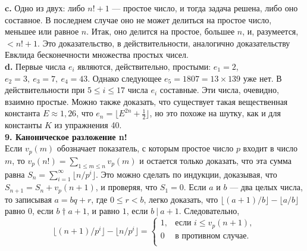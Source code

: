 \noindent\hspace*{15pt}\textbf{c.} Одно из двух: либо $n!+1$ — простое число, и тогда задача реше­на,\linebreak
либо оно составное. В последнем случае оно не может делиться на\linebreak
простое число, меньшее или равное $n$. Итак, оно делится на простое, большее $n$, и, разумеется, $<n!+1$. Это доказательство, в действитель­ности, аналогично доказательству Евклида бесконечности множества простых чисел.\newline
\\
\hspace*{15pt}\textbf{d.} Первые числа $e_i$ являются, действительно, простыми: $e_1=2$,\linebreak
$e_2=3,~e_3=7,~e_4=43$. Однако следующее\:\: $e_5=1807=13\times139$\:\: уже нет.\linebreak
В действительности при $5\leqslant i\leqslant17$ числа $e_i$ составные. Эти числа, очевидно,\linebreak
взаимно простые. Можно также доказать, что существует такая\linebreak
вещественная константа $E\approx1,26$, что $e_n=\lfloor E^{2n}+\frac{1}{2}\rfloor$, но это похоже\linebreak
на шутку, как и для константы $K$ из упражнения 40.\newline
\\
\noindent\textbf{9. Каноническое разложение n! } \newline 
\\
\hspace*{15pt}Если $v_p(m)$ обозначает показатель, с которым простое число $p$ вхо­дит\linebreak
в число $m$, то $v_p(n!)=\sum_{1\leqslant m\leqslant n}v_p(m)$ и остается только доказать, что\linebreak
эта сумма равна $S_n=\sum^{\infty}_{i=1}\lfloor n/p^i\rfloor$. Это можно сделать по индук­ции,\linebreak
доказывая, что $S_{n+1}=S_n+v_p(n+1)$, и проверяя, что $S_1=0$. Если $a$ и $b$\linebreak
— два целых числа, то записывая $a=bq+r$, где $0\leqslant r<b$, легко доказать,\linebreak
что $\lfloor(a+1)/b\rfloor-\lfloor a/b\rfloor$ равно $0$, если $b\dagger a+1$, и равно $1$, если $b~|~a+1$.\linebreak
Следовательно,
\begin{equation*}\lfloor (n+1)/p^i\rfloor - \lfloor n/p^i\rfloor =
\begin{cases}
	1,& \text{если }i\leqslant v_p(n+1),\\
	0& \text{в противном случае.}\\
\end{cases}
\end{equation*}

